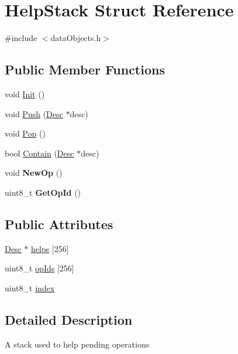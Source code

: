 \hypertarget{structHelpStack}{}\section{Help\+Stack Struct Reference}
\label{structHelpStack}


{\ttfamily \#include $<$data\+Objects.\+h$>$}

\subsection*{Public Member Functions}
\begin{DoxyCompactItemize}
\item 
void \hyperlink{structHelpStack_ae91b62881ed5760e04f36a858d775fed}{Init} ()
\item 
void \hyperlink{structHelpStack_a184dc0935dc30b94113a938d4ab7fe28}{Push} (\hyperlink{structDesc}{Desc} $\ast$desc)
\item 
void \hyperlink{structHelpStack_a1e027e2dcf0c4bec15add32c0f04377a}{Pop} ()
\item 
bool \hyperlink{structHelpStack_a7fa3dd720f64464467158a74ac7c19c1}{Contain} (\hyperlink{structDesc}{Desc} $\ast$desc)
\item 
\mbox{\label{structHelpStack_a68d62237f56f9512723baa44d9636175}} 
void {\bfseries New\+Op} ()
\item 
\mbox{\label{structHelpStack_a864b787b748f3a56124c7ce548bd8f31}} 
uint8\+\_\+t {\bfseries Get\+Op\+Id} ()
\end{DoxyCompactItemize}
\subsection*{Public Attributes}
\begin{DoxyCompactItemize}
\item 
\hyperlink{structDesc}{Desc} $\ast$ \hyperlink{structHelpStack_a3b2078f79f39ba359f323d75968cbed0}{helps} \mbox{[}256\mbox{]}
\item 
uint8\+\_\+t \hyperlink{structHelpStack_a334edfc6ddcf054de46a50c34174d593}{op\+Ids} \mbox{[}256\mbox{]}
\item 
uint8\+\_\+t \hyperlink{structHelpStack_a0e5d134dcafa9ab20ea25b11b9bc0175}{index}
\end{DoxyCompactItemize}


\subsection{Detailed Description}
A stack used to help pending operations 

